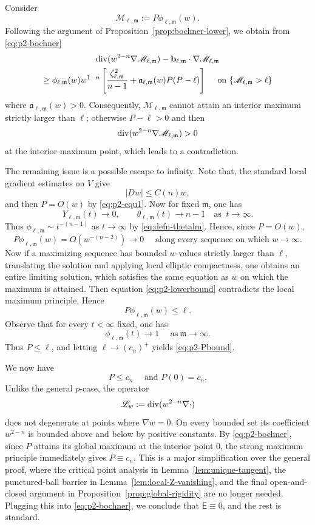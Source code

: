 \documentclass[reqno,12pt]{amsart}
\numberwithin{equation}{section}
\theoremstyle{remark}
\newcommand{\Lscr}{\mathscr L}
\newcommand{\Mscr}{\mathscr M}
\begin{document}
Consider
$$
\Mscr_{\ell,\mathfrak m}:=P\phi_{\ell,\mathfrak m}(w).
$$
Following the argument of Proposition~\ref{prop:bochner-lower}, we
obtain from \eqref{eq:p2-bochner}
\begin{multline}\label{eq:p2-lowerbound}
  {\rm div}(w^{2-n}\nabla \Mscr_{\ell, \mathfrak m})- {\mathbf b}_{\ell,\mathfrak m}\cdot \nabla \Mscr_{\ell, \mathfrak m}\\
  \ge \phi_{\ell, \mathfrak m}(w) w^{1-n}\left[\frac{\zeta_{\ell,\mathfrak m}^2}{n-1} + \mathfrak a_{\ell,\mathfrak m}(w) P (P-\ell)\right]  \quad \text{ on } \{\Mscr_{\ell, \mathfrak m} > \ell\}
\end{multline}
where $\mathfrak a_{\ell,\mathfrak m}(w)>0$. Consequently, $\Mscr_{\ell, \mathfrak m}$  cannot attain an interior maximum strictly larger than $\ell$; otherwise $P-\ell>0$ and then 
$${\rm div}(w^{2-n}\nabla \Mscr_{\ell, \mathfrak m})>0$$
at the interior maximum point, which leads to a contradiction. 
 
The remaining issue is a possible escape to infinity. Note that, the standard local gradient estimates on $V$ give
$$
|Dw|\le C(n) w,
$$
and then $P=O(w)$ by \eqref{eq:p2-equ1}.  Now for fixed 
$\mathfrak m$, one has
$$
Y_{\ell,\mathfrak m}(t)\to 0,\qquad \theta_{\ell,\mathfrak m}(t)\to n-1 \quad \text{as } \ t\to \infty.
$$
Thus $\phi_{\ell,\mathfrak m}\sim t^{-(n-1)}$ as $t\to \infty$ by \eqref{eq:defn-thetalm}. Hence, since $P=O(w)$,
$$
P\phi_{\ell,\mathfrak m}(w)=O(w^{-(n-2)})\to 0 \quad \text{ along every sequence on which } w\to \infty. 
$$
Now if a maximizing sequence has bounded $w$-values strictly larger than $\ell$, translating the solution and applying local elliptic compactness, one obtains an entire limiting solution, which satisfies the same equation as $w$ on which the maximum is attained. Then equation \eqref{eq:p2-lowerbound} contradicts the local maximum principle. Hence
$$
P\phi_{\ell,\mathfrak m}(w)\le \ell. 
$$
Observe that for every $t<\infty$ fixed, one has
$$
\phi_{\ell,\mathfrak m}(t)\to 1 \quad \text{ as} \ \mathfrak m\to \infty.
$$
Thus $P\le \ell$, and  letting $\ell\to (c_n)^+$ yields \eqref{eq:p2-Pbound}. 

We now have 
$$
P\le c_n \quad \text{ and } P(0)=c_n.
$$
Unlike the general $p$-case, the operator 
$$
\Lscr_w  := {\rm div}(w^{2-n}\nabla \cdot)
$$
does not degenerate at points where $\nabla w=0$. 
On every bounded set its coefficient $w^{2-n}$ is bounded above and below by positive constants.
By \eqref{eq:p2-bochner}, since $P$ attains its global maximum at the interior point $0$, the strong maximum principle immediately gives $P\equiv c_n$. This is a major simplification over the general proof, where the critical point analysis in Lemma~\ref{lem:unique-tangent}, the punctured-ball barrier in
Lemma~\ref{lem:local-Z-vanishing}, and the final open-and-closed argument in Proposition~\ref{prop:global-rigidity} are no longer needed. Plugging this into \eqref{eq:p2-bochner}, we conclude that $\mathsf E\equiv 0$, and the rest is standard. 
\end{document}
